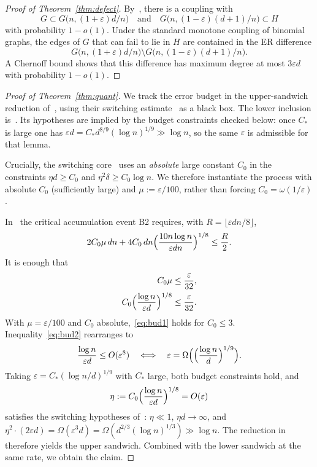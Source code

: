 \documentclass[11pt]{article}
\begin{document}
\begin{proof}[Proof of Theorem~\ref{thm:defect}]
By~\cite[Theorem~1.1]{BIM25}, there is a coupling with
\[
G\subset G\bigl(n,(1+\varepsilon)d/n\bigr)
\quad\text{and}\quad
G\bigl(n,(1-\varepsilon)(d+1)/n\bigr)\subset H
\]
with probability \(1-o(1)\).
Under the standard monotone coupling of binomial graphs, the edges of \(G\) that can
fail to lie in \(H\) are contained in the ER difference
\[
G\bigl(n,(1+\varepsilon)d/n\bigr)
\setminus
G\bigl(n,(1-\varepsilon)(d+1)/n\bigr).
\]
A Chernoff bound shows that this difference has maximum degree at most \(3\varepsilon d\)
with probability \(1-o(1)\).
\end{proof}

\begin{proof}[Proof of Theorem~\ref{thm:quant}]
We track the error budget in the upper-sandwich reduction of~\cite[§3]{BIM25},
using their switching estimate~\cite[Theorem~2.4]{BIM25} as a black box.
The lower inclusion is~\cite[Lemma~2.2]{BIM25}. Its hypotheses are implied by
the budget constraints checked below: once \(C_*\) is large one has
\(\varepsilon d=C_*d^{8/9}(\log n)^{1/9}\gg\log n\), so the same \(\varepsilon\) is admissible
for that lemma.

 Crucially, the switching core~\cite[Theorem~4.1]{BIM25} uses an
\emph{absolute} large constant \(C_0\) in the constraints
\(\eta d\ge C_0\) and \(\eta^2\delta\ge C_0\log n\).
We therefore instantiate the process with absolute \(C_0\) (sufficiently large)
and \(\mu:=\varepsilon/100\), rather than forcing \(C_0=\omega(1/\varepsilon)\).

In~\cite[§3.5.5]{BIM25} the critical accumulation event B2 requires, with
\(R=\lfloor\varepsilon dn/8\rfloor\),
\begin{equation}
\label{eq:B2}
2C_0\mu\,dn + 4C_0\,dn\Bigl(\frac{10n\log n}{\varepsilon dn}\Bigr)^{1/8}
\le\frac R2.
\end{equation}
It is enough that
\begin{align}
C_0\mu&\le\frac{\varepsilon}{32},\label{eq:bud1}\\
C_0\Bigl(\frac{\log n}{\varepsilon d}\Bigr)^{1/8}&\le\frac{\varepsilon}{32}.\label{eq:bud2}
\end{align}
With \(\mu=\varepsilon/100\) and \(C_0\) absolute,~\eqref{eq:bud1} holds for
\(C_0\le 3\).
Inequality~\eqref{eq:bud2} rearranges to
\[
\frac{\log n}{\varepsilon d}
\le O(\varepsilon^{8})
\quad\Longleftrightarrow\quad
\varepsilon=\Omega\Bigl(\Bigl(\frac{\log n}{d}\Bigr)^{1/9}\Bigr).
\]
Taking \(\varepsilon=C_*(\log n/d)^{1/9}\) with \(C_*\) large, both budget
constraints hold, and
\[
\eta:=C_0\Bigl(\frac{\log n}{\varepsilon d}\Bigr)^{1/8}=O(\varepsilon)
\]
satisfies the switching hypotheses of~\cite[Theorem~4.1]{BIM25}:
\(\eta\ll 1\), \(\eta d\to\infty\), and
\(\eta^2\cdot(2\varepsilon d)=\Omega(\varepsilon^3 d)=\Omega(d^{2/3}(\log n)^{1/3})\gg\log n\).
The reduction in~\cite[§3]{BIM25} therefore yields the upper sandwich.
Combined with the lower sandwich at the same rate, we obtain the claim.
\end{proof}
\end{document}
